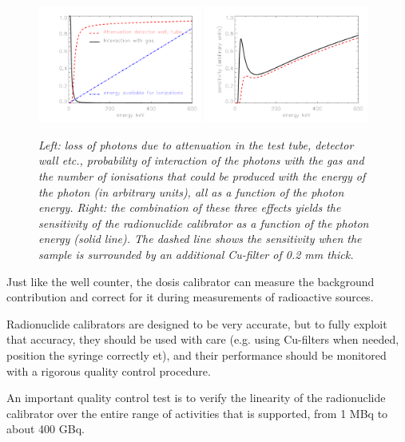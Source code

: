 \documentclass[11pt,oneside]{article}
\begin{document}
\begin{figure}[tb]
\includegraphics[width=0.48\textwidth]{figs/fig_dosecalib1.pdf}
\includegraphics[width=0.48\textwidth]{figs/fig_dosecalib2.pdf}
\caption{\label{fig:dosecalib} \emph{Left: loss of photons due to
    attenuation in the test tube, detector wall etc., probability of
    interaction of the photons with the gas and the number of
    ionisations that could be produced with the energy of the photon
    (in arbitrary units), all as a function of the photon
    energy. Right: the combination of these three effects yields the
    sensitivity of the radionuclide calibrator as a function of the photon
    energy (solid line). The dashed line shows the sensitivity when
    the sample is surrounded by an additional Cu-filter of 0.2 mm thick.}}
\end{figure}

Just like the well counter, the dosis calibrator can measure the
background contribution and correct for it during measurements of
radioactive sources.

Radionuclide calibrators are designed to be very accurate, but to fully
exploit that accuracy, they should be used with care (e.g. using
Cu-filters when needed, position the syringe correctly et), and their
performance should be monitored with a rigorous quality control
procedure.

An important quality control test is to verify the linearity of the
radionuclide calibrator over the entire range of activities that is
supported, from 1 MBq to about 400 GBq.
\end{document}
